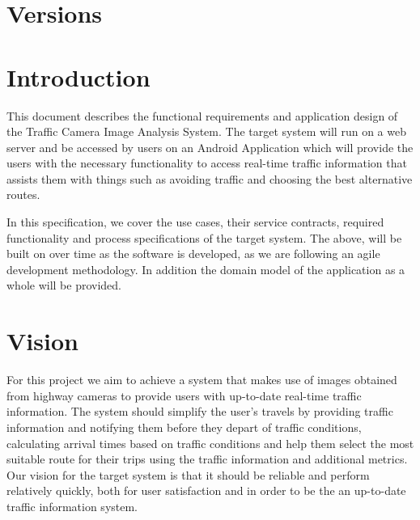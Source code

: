 \documentclass[a4paper,12pt]{article}
\begin{document}
\newpage
\tableofcontents
\newpage

\newpage
\section{Versions}
\newpage

\section{Introduction}
This document describes the functional requirements and application design of the Traffic Camera Image Analysis System. The target system will run on a web server  and be accessed by users on an Android Application which will provide the users with the necessary functionality to access real-time traffic information that assists them with things such as avoiding traffic and choosing the best alternative routes. 

In this specification, we cover the use cases, their service contracts, required functionality and process specifications of the target system. The above, will be built on over time as the software is developed, as we are following an agile development methodology. In addition the domain model of the application as a whole will be provided.
\section{Vision}
For this project we aim to achieve a system that makes use of images obtained from highway cameras to provide users with up-to-date real-time traffic information. The system should simplify the user's travels by providing traffic information and notifying them before they depart of traffic conditions, calculating arrival times based on traffic conditions and help them select the most suitable route for their trips using the traffic information and additional metrics. Our vision for the target system is that it should be reliable and perform relatively quickly, both for user satisfaction and in order to be the an up-to-date traffic information system.
\end{document}
